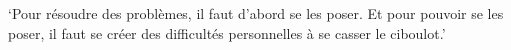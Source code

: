 \begin{savequote}[8cm]
‘Pour résoudre des problèmes, il faut d'abord se les poser. Et pour pouvoir se les poser, il faut se créer des difficultés personnelles à se casser le ciboulot.’

\end{savequote}

\chapter*{\label{ch:objectives}}



\subsection*{} %






